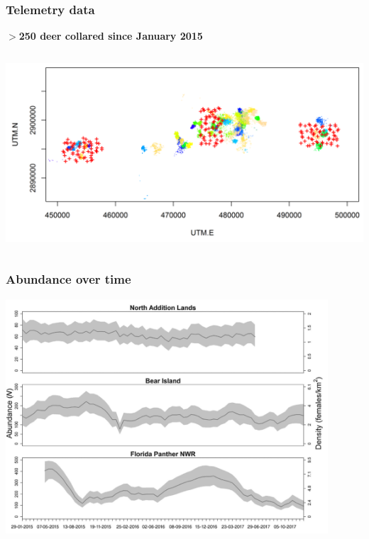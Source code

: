\documentclass[color=usenames,dvipsnames]{beamer}
\begin{document}
\begin{frame}
  \frametitle{Telemetry data}
  \centering
  \bf
  $>$250 deer collared since January 2015 \\
  \begin{columns}
    \column{\dimexpr\paperwidth-10pt}
    \includegraphics[width=\textwidth]{figs/camTelem}
  \end{columns}
\end{frame}



\begin{frame}
  \frametitle{Abundance over time}
  \centering
  \includegraphics[width=0.9\textwidth]{figs/deer-N-timeseries} \\
\end{frame}
\end{document}
